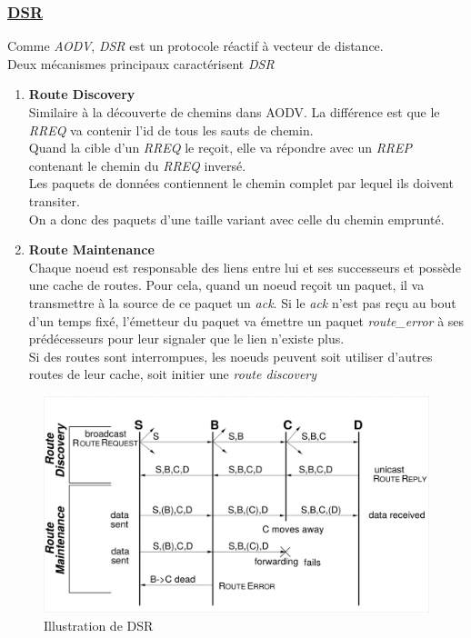 \documentclass[a4paper, 12pt]{report}
\begin{document}
    \subsubsection{\underline{DSR}}%
        Comme \textit{AODV}, \textit{DSR} est un protocole réactif à vecteur de distance.\\
        Deux mécanismes principaux caractérisent \textit{DSR}\\
        \begin{enumerate}
            \item \textbf{Route Discovery}\\
                Similaire à la découverte de chemins dans AODV. La différence est que le \textit{RREQ} va contenir l'id de tous les sauts de chemin.\\
                Quand la cible d'un \textit{RREQ} le reçoit, elle va répondre avec un \textit{RREP} contenant le chemin du \textit{RREQ} inversé.\\
                Les paquets de données contiennent le chemin complet par lequel ils doivent transiter.\\
                On a donc des paquets d'une taille variant avec celle du chemin emprunté.
            \item \textbf{Route Maintenance}\\
                Chaque noeud est responsable des liens entre lui et ses successeurs et possède une cache de routes.
                Pour cela, quand un noeud reçoit un paquet, il va transmettre à la source de ce paquet
                un \textit{ack}. Si le \textit{ack} n'est pas reçu au bout d'un temps fixé, l'émetteur du paquet va émettre
                un paquet \textit{route\_error} à ses prédécesseurs pour leur signaler que le lien n'existe plus.\\
                Si des routes sont interrompues, les noeuds peuvent soit utiliser d'autres routes de leur cache, soit initier une \textit{route discovery}

        \end{enumerate}
        \begin{figure}[H]
            \centering
            \includegraphics[scale=0.12]{images/ack_dsr.png}
            \caption{Illustration de DSR \cite{dsr_for_adHoc_network}}
            \label{dsr_image}
        \end{figure}
\end{document}
